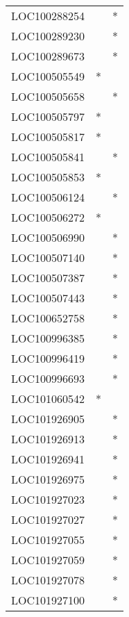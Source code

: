 \begin{longtable}{lcc}
LOC100288254    &                &          * \\
LOC100289230    &                &          * \\
LOC100289673    &                &          * \\
LOC100505549    &              * &            \\
LOC100505658    &                &          * \\
LOC100505797    &              * &            \\
LOC100505817    &              * &            \\
LOC100505841    &                &          * \\
LOC100505853    &              * &            \\
LOC100506124    &                &          * \\
LOC100506272    &              * &            \\
LOC100506990    &                &          * \\
LOC100507140    &                &          * \\
LOC100507387    &                &          * \\
LOC100507443    &                &          * \\
LOC100652758    &                &          * \\
LOC100996385    &                &          * \\
LOC100996419    &                &          * \\
LOC100996693    &                &          * \\
LOC101060542    &              * &            \\
LOC101926905    &                &          * \\
LOC101926913    &                &          * \\
LOC101926941    &                &          * \\
LOC101926975    &                &          * \\
LOC101927023    &                &          * \\
LOC101927027    &                &          * \\
LOC101927055    &                &          * \\
LOC101927059    &                &          * \\
LOC101927078    &                &          * \\
LOC101927100    &                &          * \\

\end{longtable}
